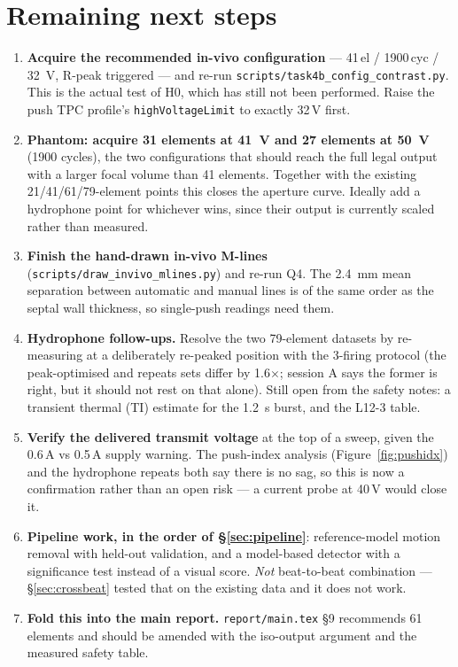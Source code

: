 \documentclass[11pt,a4paper]{article}
\begin{document}
\section{Remaining next steps}\label{sec:next}
\begin{enumerate}[label=\textbf{\arabic*.}]
  \item \textbf{Acquire the recommended in-vivo configuration} --- 41\,el / 1900\,cyc /
  \SI{32}{\volt}, R-peak triggered --- and re-run \texttt{scripts/task4b\_config\_contrast.py}. This
  is the actual test of H0, which has still not been performed. Raise the push TPC profile's
  \texttt{highVoltageLimit} to exactly 32\,V first.
  \item \textbf{Phantom: acquire 31 elements at \SI{41}{\volt} and 27 elements at \SI{50}{\volt}}
  (1900 cycles), the two configurations that should reach the full legal output with a larger focal
  volume than 41 elements. Together with the existing 21/41/61/79-element points this closes the
  aperture curve. Ideally add a hydrophone point for whichever wins, since their output is currently
  scaled rather than measured.
  \item \textbf{Finish the hand-drawn in-vivo M-lines} (\texttt{scripts/draw\_invivo\_mlines.py})
  and re-run Q4. The \SI{2.4}{\milli\metre} mean separation between automatic and manual lines is of
  the same order as the septal wall thickness, so single-push readings need them.
  \item \textbf{Hydrophone follow-ups.} Resolve the two 79-element datasets by re-measuring at a
  deliberately re-peaked position with the 3-firing protocol (the peak-optimised and repeats sets
  differ by 1.6$\times$; session A says the former is right, but it should not rest on that alone).
  Still open from the safety notes: a transient thermal (TI) estimate for the \SI{1.2}{\second}
  burst, and the L12-3 table.
  \item \textbf{Verify the delivered transmit voltage} at the top of a sweep, given the 0.6\,A vs
  0.5\,A supply warning. The push-index analysis (Figure~\ref{fig:pushidx}) and the hydrophone
  repeats both say there is no sag, so this is now a confirmation rather than an open risk --- a
  current probe at 40\,V would close it.
  \item \textbf{Pipeline work, in the order of \S\ref{sec:pipeline}}: reference-model motion removal
  with held-out validation, and a model-based detector with a significance test instead of a visual
  score. \emph{Not} beat-to-beat combination --- \S\ref{sec:crossbeat} tested that on the existing
  data and it does not work.
  \item \textbf{Fold this into the main report.} \texttt{report/main.tex} \S9 recommends 61 elements
  and should be amended with the iso-output argument and the measured safety table.
\end{enumerate}
\end{document}
